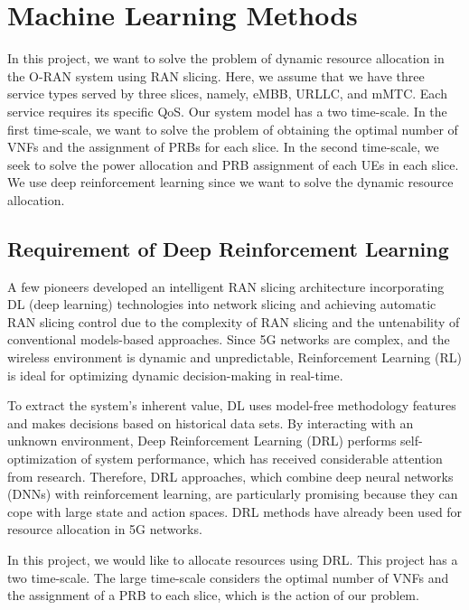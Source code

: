\documentclass{article}
\begin{document}
\section{Machine Learning Methods}
In this project, we want to solve the problem of dynamic resource allocation in the O-RAN system using RAN slicing. Here, we assume that we have three service types served by three slices, namely, eMBB, URLLC, and mMTC. Each service requires its specific QoS.
Our system model has a two time-scale. In the first time-scale, we want to solve the problem of obtaining the optimal number of VNFs and the assignment of PRBs for each slice. In the second time-scale, we seek to solve the power allocation and PRB assignment of each UEs in each slice. We use deep reinforcement learning since we want to solve the dynamic resource allocation.

\subsection{Requirement of Deep Reinforcement Learning}
A few pioneers developed an intelligent RAN slicing architecture incorporating DL (deep learning) technologies into network slicing and achieving automatic RAN slicing control due to the complexity of RAN slicing and the untenability of conventional models-based approaches. 
Since 5G networks are complex, and the wireless environment is dynamic and unpredictable, Reinforcement Learning (RL) is ideal for optimizing dynamic decision-making in real-time.

To extract the system's inherent value, DL uses model-free methodology features and makes decisions based on historical data sets. 
By interacting with an unknown environment, Deep Reinforcement Learning (DRL) performs self-optimization of system performance, which has received considerable attention from research.
Therefore, DRL approaches, which combine deep neural networks (DNNs) with reinforcement learning, are particularly promising because they can cope with large state and action spaces.
DRL methods have already been used for resource allocation in 5G networks.

In this project, we would like to allocate resources using DRL. This project has a two time-scale. The large time-scale considers the optimal number of VNFs and the assignment of a PRB to each slice, which is the action of our problem.
\end{document}
